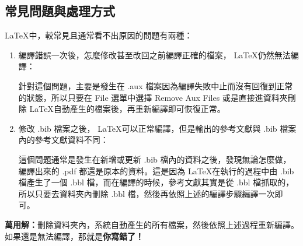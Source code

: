 \documentclass[12pt,a4paper]{report}
\begin{document}
\begin{CJK}{UTF8}{bkai}
\section{常見問題與處理方式}

 \LaTeX 中，較常見且通常看不出原因的問題有兩種：
\begin{enumerate}
\item 編譯錯誤一次後，怎麼修改甚至改回之前編譯正確的檔案， \LaTeX 仍然無法編譯：

針對這個問題，主要是發生在 .aux 檔案因為編譯失敗中止而沒有回復到正常的狀態，所以只要在 File 選單中選擇 Remove Aux Files 或是直接進資料夾刪除 \LaTeX 自動產生的檔案後，再重新編譯即可恢復正常。
\item 修改 .bib 檔案之後， \LaTeX 可以正常編譯，但是輸出的參考文獻與 .bib 檔案內的參考文獻資料不同：

這個問題通常是發生在新增或更新 .bib 檔內的資料之後，發現無論怎麼做，編譯出來的 .pdf 都還是原本的資料。這是因為 \LaTeX 在執行的過程中由 .bib 檔產生了一個 .bbl 檔，而在編譯的時候，參考文獻其實是從 .bbl 檔抓取的，所以只要去資料夾內刪除 .bbl 檔，然後再依照上述的編譯步驟編譯一次即可。 
\end{enumerate}

\begin{framed}
\noindent\textbf{萬用解：}刪除資料夾內，系統自動產生的所有檔案，然後依照上述過程重新編譯。如果還是無法編譯，那就是\textbf{你寫錯了！}
\end{framed}

\clearpage
\end{CJK}
\end{document}
